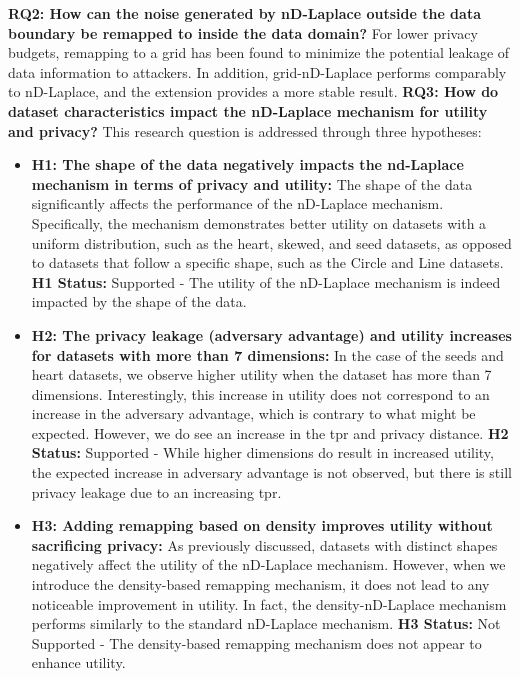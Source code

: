 \textbf{RQ2: How can the noise generated by nD-Laplace outside the data boundary be remapped to inside the data domain?} \newline
For lower privacy budgets, remapping to a grid has been found to minimize the potential leakage of data information to attackers.
In addition, grid-nD-Laplace performs comparably to nD-Laplace, and the extension provides a more stable result. \newline
\textbf{RQ3: How do dataset characteristics impact the nD-Laplace mechanism for utility and privacy?} \newline
This research question is addressed through three hypotheses:
\begin{itemize}
	\item \textbf{H1: The shape of the data negatively impacts the nd-Laplace mechanism in terms of privacy and utility:}
	The shape of the data significantly affects the performance of the nD-Laplace mechanism. Specifically, the mechanism demonstrates better utility on datasets with a uniform distribution, such as the heart, skewed, and seed datasets, as opposed to datasets that follow a specific shape, such as the Circle and Line datasets. \newline  
    \textbf{H1 Status:} Supported - The utility of the nD-Laplace mechanism is indeed impacted by the shape of the data.
	\item \textbf{H2: The privacy leakage (adversary advantage) and utility increases for datasets with more than 7 dimensions:}
	      In the case of the seeds and heart datasets, we observe higher utility when the dataset has more than 7 dimensions. Interestingly, this increase in utility does not correspond to an increase in the adversary advantage, which is contrary to what might be expected. However, we do see an increase in the \gls{tpr} and privacy distance. \newline \textbf{H2 Status:} Supported - While higher dimensions do result in increased utility, the expected increase in adversary advantage is not observed, but there is still privacy leakage due to an increasing \gls{tpr}.
	\item \textbf{H3: Adding remapping based on density improves utility without sacrificing privacy:}
	     As previously discussed, datasets with distinct shapes negatively affect the utility of the nD-Laplace mechanism. However, when we introduce the density-based remapping mechanism, it does not lead to any noticeable improvement in utility. In fact, the density-nD-Laplace mechanism performs similarly to the standard nD-Laplace mechanism. \newline \textbf{H3 Status:} Not Supported - The density-based remapping mechanism does not appear to enhance utility.
\end{itemize}
